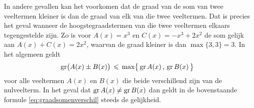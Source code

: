 \documentclass{ximera}
\begin{document}
In andere gevallen kan het voorkomen dat de graad van de som van twee veeltermen kleiner is dan de graad van elk van die twee veeltermen. Dat is precies het geval wanneer de hoogste\-graadstermen van die twee veeltermen elkaars tegengestelde zijn. Zo is voor \(A(x) = x^3\) en \(C(x) = -x^3 + 2x^2\) de som gelijk aan \(A(x) + C(x) = 2x^2\), waarvan de graad kleiner is dan \(\max\{3,3\} = 3\). In het algemeen geldt  
\begin{equation} 
\operatorname{gr}\bigl( A(x) \pm B(x) \bigr) \, \leqslant \, \max \bigl\{ \,\operatorname{gr} A(x)\, , \, \operatorname{gr} B(x) \, \bigr\}
\end{equation}
voor alle veeltermen \(A(x)\) en \(B(x)\) die beide verschillend zijn van de nulveelterm. In het geval dat \(\operatorname{gr} A(x) \neq \operatorname{gr} B(x)\) dan geldt in de bovenstaande formule \eqref{eq:graadsomenverschil} steeds de gelijkheid. 




\end{document}
